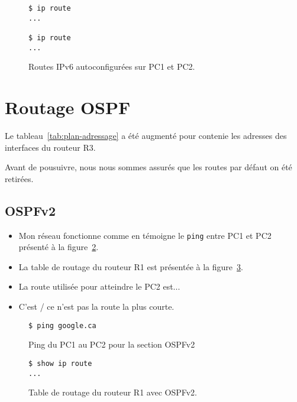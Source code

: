 \documentclass[]{article}
\begin{document}
\begin{figure} 
      \centering
      \begin{lstlisting}
$ ip route
...

$ ip route
...
      \end{lstlisting}
      \caption[]{Routes IPv6 autoconfigurées sur PC1 et PC2.}
      \label{fig:ipv6-routes-pc1-pc2}
\end{figure}

\section*{Routage OSPF}

Le tableau~\ref{tab:plan-adressage} a été augmenté pour contenie les adresses des interfaces
du routeur R3.

Avant de pousuivre, nous nous sommes assurés que les routes par défaut on été retirées.

\subsection*{OSPFv2}

\begin{itemize}
      \item Mon réseau fonctionne comme en témoigne le \texttt{ping} entre PC1 et PC2
            présenté à la figure~\ref{fig:ping-pc1-pc2-ospfv2}.
      \item La table de routage du routeur R1 est présentée à la
            figure~\ref{fig:ospfv2-routes-r1}.
      \item La route utilisée pour atteindre le PC2 est...
      \item C'est / ce n'est pas la route la plus courte.
\end{itemize}

\begin{figure} 
      \centering
      \begin{lstlisting}
$ ping google.ca
      \end{lstlisting}
      \caption[]{Ping du PC1 au PC2 pour la section OSPFv2}
      \label{fig:ping-pc1-pc2-ospfv2}
\end{figure}

\begin{figure} 
      \centering
      \begin{lstlisting}
$ show ip route
...
      \end{lstlisting}
      \caption[]{Table de routage du routeur R1 avec OSPFv2.}
      \label{fig:ospfv2-routes-r1}
\end{figure}
\end{document}
